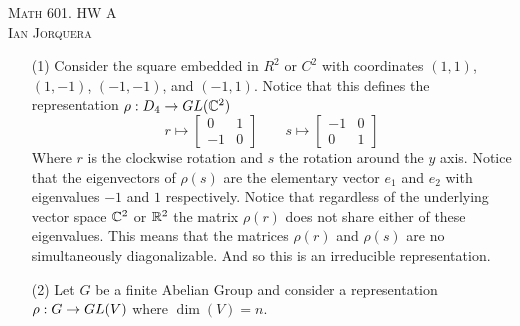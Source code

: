 \documentclass[12pt]{amsart}
\begin{document}
\begin{center}
    \textsc{Math 601. HW A\\ Ian Jorquera}
\end{center}
\vspace{1em}
\begin{itemize} %
    \item[(1)] Consider the square embedded in $R^2$ or $C^2$ with coordinates
     $(1,1)$, $(1,-1)$, $(-1,-1)$, and $(-1,1)$. Notice that this defines the representation $\rho:D_4\rightarrow GL(\mathbb{C}^2)$
     \[r\mapsto\begin{bmatrix}
        0 & 1\\
        -1 & 0
     \end{bmatrix}\;\;\;\;\;\;\; s\mapsto\begin{bmatrix}
        -1 & 0\\
        0 & 1
     \end{bmatrix}\]
     Where $r$ is the clockwise rotation and $s$ the rotation around the $y$ axis.
     Notice that the eigenvectors of $\rho(s)$ are the elementary vector $e_1$ and $e_2$ 
     with eigenvalues $-1$ and $1$ respectively. Notice that regardless of the underlying 
     vector space $\mathbb{C}^2$ or $\mathbb{R}^2$ the matrix $\rho(r)$ does not share either of these eigenvalues.
     This means that the matrices $\rho(r)$ and $\rho(s)$ are no simultaneously 
     diagonalizable. And so this is an irreducible representation.\\


     \item[(2)] %
     Let $G$ be a finite Abelian Group and consider a representation $\rho:G\rightarrow GL(V)$ where $\dim(V)=n$. 
      

\end{itemize}
\end{document}
